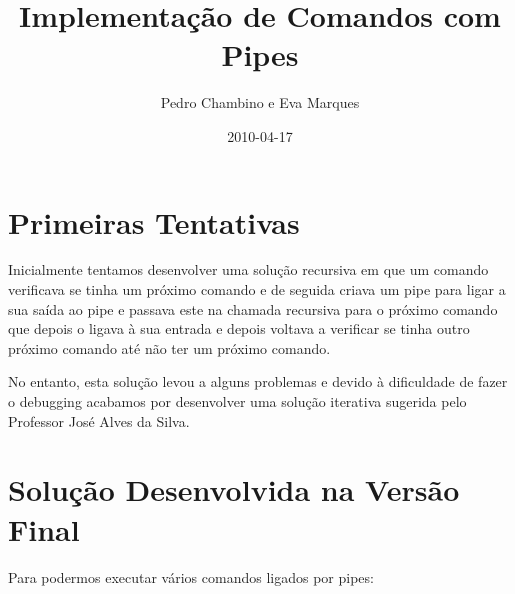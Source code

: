 \documentclass[11pt]{article}
\title{Implementação de Comandos com Pipes}
\author{Pedro Chambino e Eva Marques}
\date{2010-04-17}                                           %
\begin{document}
\maketitle

\section{Primeiras Tentativas}

Inicialmente tentamos desenvolver uma solução recursiva em que um comando verificava se tinha um próximo comando e de seguida criava um pipe para ligar a sua saída ao pipe e passava este na chamada recursiva para o próximo comando que depois o ligava à sua entrada e depois voltava a verificar se tinha outro próximo comando até não ter um próximo comando.

No entanto, esta solução levou a alguns problemas e devido à dificuldade de fazer o debugging acabamos por desenvolver uma solução iterativa sugerida pelo Professor José Alves da Silva.

\section{Solução Desenvolvida na Versão Final}

Para podermos executar vários comandos ligados por pipes:
\end{document}
